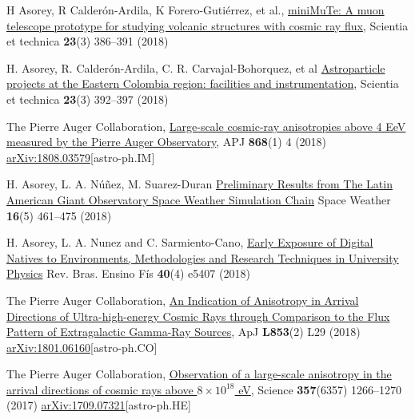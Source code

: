 \begin{etaremune}
\item {} H Asorey, R Calderón-Ardila, K Forero-Gutiérrez, et al., \href{http://dx.doi.org/10.22517/23447214.17501}{miniMuTe: A muon telescope prototype for studying volcanic structures with cosmic ray flux}, Scientia et technica {\textbf{23}}(3) 386--391 (2018)

\item {}H. Asorey, R. Calderón-Ardila, C. R. Carvajal-Bohorquez, et al \href{http://dx.doi.org/10.22517/23447214.17561}{Astroparticle projects at the Eastern Colombia region: facilities and instrumentation}, Scientia et technica {\textbf{23}}(3) 392--397 (2018)

\item {}The Pierre Auger Collaboration, \href{}{{Large-scale cosmic-ray anisotropies above 4 EeV measured by the Pierre Auger Observatory}}, APJ {\textbf{868}}(1) 4 (2018) \href{https://arxiv.org/abs/1808.03579}{arXiv:1808.03579}[astro-ph.IM]

\item {}H. Asorey, L. A. Núñez, M. Suarez-Duran \href{https://doi.org/10.1002/2017SW001774}{{Preliminary Results from The Latin American Giant Observatory Space Weather Simulation Chain}} Space Weather {\textbf{16}}(5) 461--475 (2018) %

\item {} H. Asorey, L. A. Nunez and C. Sarmiento-Cano, \href{http://dx.doi.org/10.1590/1806-9126-rbef-2018-0092}{{Early Exposure of Digital Natives to Environments, Methodologies and Research Techniques in University Physics}} Rev.
Bras.
Ensino Fís {\textbf{40}}(4) e5407 (2018) %

\item {}The Pierre Auger Collaboration, \href{https://doi.org/10.3847/2041-8213/aaa66d}{{An Indication of Anisotropy in Arrival Directions of Ultra-high-energy Cosmic Rays through Comparison to the Flux Pattern of Extragalactic Gamma-Ray Sources}}, ApJ {\textbf{L853}}(2) L29 (2018) \href{https://arxiv.org/abs/1801.06160}{arXiv:1801.06160}[astro-ph.CO]

\item {}The Pierre Auger Collaboration, \href{https://doi.org/10.1126/science.aan4338}{{Observation of a large-scale anisotropy in the arrival directions of cosmic rays above $8\times 10^{18}$ eV}}, Science {\textbf{357}}(6357) 1266--1270 (2017) \href{https://arxiv.org/abs/1709.07321}{arXiv:1709.07321}[astro-ph.HE]


\end{etaremune}
